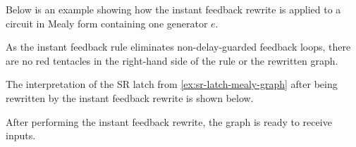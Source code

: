 \begin{example}\label{ex:instant-feedback-rewrite}
    Below is an example showing how the instant feedback rewrite is applied to
    a circuit in Mealy form containing one generator \(e\).
    \begin{center}
        
    \end{center}
\end{example}

As the instant feedback rule eliminates non-delay-guarded feedback loops, there
are no red tentacles in the right-hand side of the rule or the rewritten graph.

\begin{example}\label{ex:sr-latch-instant-feedback-graph}
    The interpretation of the SR latch from \cref{ex:sr-latch-mealy-graph}
    after being rewritten by the instant feedback rewrite is shown below.
    \vspace{-1em}
    \begin{center}
    \end{center}
\end{example}

After performing the instant feedback rewrite, the graph is ready to receive
inputs.

